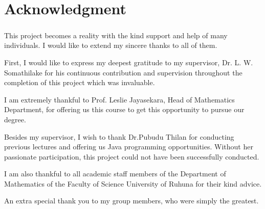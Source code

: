 \chapter*{Acknowledgment}
\paragraph{}
 
This project becomes a reality with the kind support and help of many individuals. I would like to extend my sincere thanks to all of them.

First, I would like to express my deepest gratitude to my supervisor, Dr. L. W. Somathilake for his continuous contribution and supervision throughout the completion of this project which was invaluable.

I am extremely thankful to Prof. Leslie Jayasekara, Head of Mathematics Department, for offering us this course to get this opportunity to pursue our degree.

Besides my supervisor, I wish to thank Dr.Pubudu Thilan for conducting previous lectures and offering us Java programming opportunities. Without her passionate participation,
this project could not have been successfully conducted.

I am also thankful to all academic staff members of the Department of Mathematics of the Faculty of Science University of Ruhuna for their kind advice.

An extra special thank you to my group members, who were simply the greatest. 

